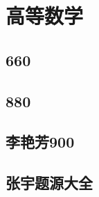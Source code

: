 \documentclass[12pt, a4paper, oneside, UTF8]{ctexbook}
\begin{document}
% 
\else
\fi
\chapter{高等数学}

\section{660}

\section{880}

\section{李艳芳900}

\section{张宇题源大全}
\ifx\allfiles\undefined
\end{document}
